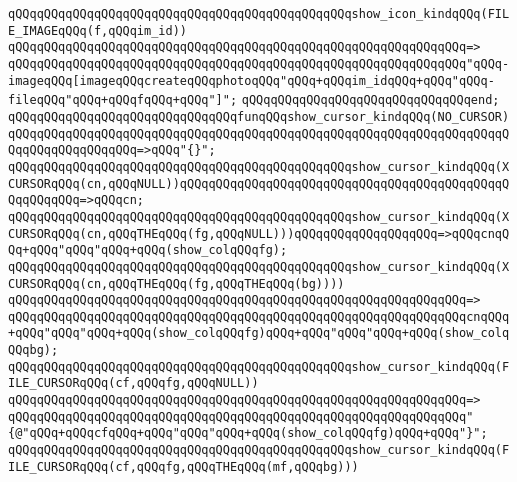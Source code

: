 \newline
\verb|qQQqqQQqqQQqqQQqqQQqqQQqqQQqqQQqqQQqqQQqqQQqqQQqshow_icon_kindqQQq(FILE_IMAGEqQQq(f,qQQqim_id))|\newline
\verb|qQQqqQQqqQQqqQQqqQQqqQQqqQQqqQQqqQQqqQQqqQQqqQQqqQQqqQQqqQQqqQQq=>|\newline
\verb|qQQqqQQqqQQqqQQqqQQqqQQqqQQqqQQqqQQqqQQqqQQqqQQqqQQqqQQqqQQqqQQq"qQQq-imageqQQq[imageqQQqcreateqQQqphotoqQQq"qQQq+qQQqim_idqQQq+qQQq"qQQq-fileqQQq"qQQq+qQQqfqQQq+qQQq"]";|\newline
\verb|qQQqqQQqqQQqqQQqqQQqqQQqqQQqqQQqend;|\newline
\newline
\verb|qQQqqQQqqQQqqQQqqQQqqQQqqQQqqQQqfunqQQqshow_cursor_kindqQQq(NO_CURSOR)qQQqqQQqqQQqqQQqqQQqqQQqqQQqqQQqqQQqqQQqqQQqqQQqqQQqqQQqqQQqqQQqqQQqqQQqqQQqqQQqqQQqqQQq=>qQQq"{}";|\newline
\verb|qQQqqQQqqQQqqQQqqQQqqQQqqQQqqQQqqQQqqQQqqQQqqQQqshow_cursor_kindqQQq(XCURSORqQQq(cn,qQQqNULL))qQQqqQQqqQQqqQQqqQQqqQQqqQQqqQQqqQQqqQQqqQQqqQQqqQQqqQQq=>qQQqcn;|\newline
\verb|qQQqqQQqqQQqqQQqqQQqqQQqqQQqqQQqqQQqqQQqqQQqqQQqshow_cursor_kindqQQq(XCURSORqQQq(cn,qQQqTHEqQQq(fg,qQQqNULL)))qQQqqQQqqQQqqQQqqQQq=>qQQqcnqQQq+qQQq"qQQq"qQQq+qQQq(show_colqQQqfg);|\newline
\newline
\verb|qQQqqQQqqQQqqQQqqQQqqQQqqQQqqQQqqQQqqQQqqQQqqQQqshow_cursor_kindqQQq(XCURSORqQQq(cn,qQQqTHEqQQq(fg,qQQqTHEqQQq(bg))))|\newline
\verb|qQQqqQQqqQQqqQQqqQQqqQQqqQQqqQQqqQQqqQQqqQQqqQQqqQQqqQQqqQQqqQQq=>|\newline
\verb|qQQqqQQqqQQqqQQqqQQqqQQqqQQqqQQqqQQqqQQqqQQqqQQqqQQqqQQqqQQqqQQqcnqQQq+qQQq"qQQq"qQQq+qQQq(show_colqQQqfg)qQQq+qQQq"qQQq"qQQq+qQQq(show_colqQQqbg);|\newline
\newline
\verb|qQQqqQQqqQQqqQQqqQQqqQQqqQQqqQQqqQQqqQQqqQQqqQQqshow_cursor_kindqQQq(FILE_CURSORqQQq(cf,qQQqfg,qQQqNULL))|\newline
\verb|qQQqqQQqqQQqqQQqqQQqqQQqqQQqqQQqqQQqqQQqqQQqqQQqqQQqqQQqqQQqqQQq=>|\newline
\verb|qQQqqQQqqQQqqQQqqQQqqQQqqQQqqQQqqQQqqQQqqQQqqQQqqQQqqQQqqQQqqQQq"{@"qQQq+qQQqcfqQQq+qQQq"qQQq"qQQq+qQQq(show_colqQQqfg)qQQq+qQQq"}";|\newline
\newline
\verb|qQQqqQQqqQQqqQQqqQQqqQQqqQQqqQQqqQQqqQQqqQQqqQQqshow_cursor_kindqQQq(FILE_CURSORqQQq(cf,qQQqfg,qQQqTHEqQQq(mf,qQQqbg)))|\newline
